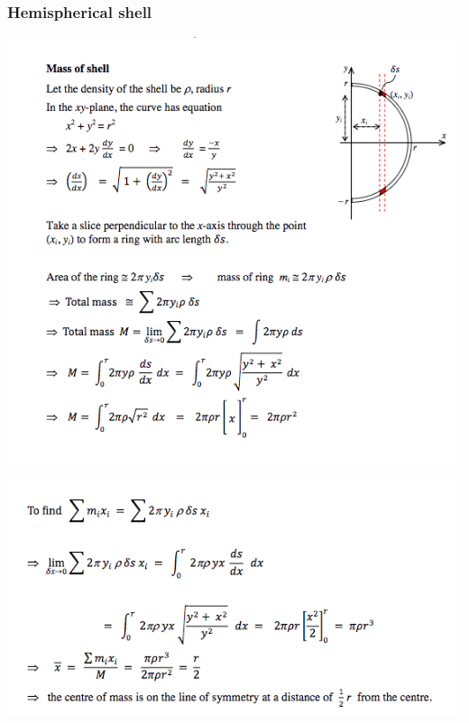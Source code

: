 \documentclass[a4paper]{article}
\begin{document}
\subsubsection{Hemispherical shell}
\begin{center}
    \includegraphics[scale=0.5]{img_M/14_eg2}
\end{center}
\begin{center}
    \includegraphics[scale=0.5]{img_M/14_eg2_2}
\end{center}
\end{document}
